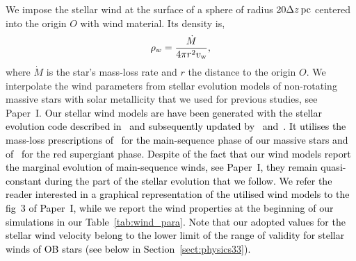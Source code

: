 \documentclass[useAMS,usenatbib]{mn2e}
\begin{document}
We impose the stellar wind at the surface of a sphere of 
radius $20\Delta z\, \rm pc$ centered into the origin $O$ with 
wind material. Its density is, 
%
\begin{equation}
	\rho_{w} = \frac{ \dot{M} }{ 4\pi r^{2} v_{\rm w} },
\label{eq:wind}
\end{equation}
%
where $\dot{M}$ is the star's mass-loss rate and $r$ the distance to the origin 
$O$. We interpolate the wind parameters from stellar evolution models of 
non-rotating massive stars with solar metallicity that we used for previous 
studies, see Paper~I. 
\textcolor{black}{
Our stellar wind models are have been generated with the stellar evolution code 
described in~\citet{heger_apj_626_2005} and subsequently updated 
by~\citet{yoon_443_aa_2005,petrovic_aa_435_2005} and~\citet{brott_aa_530_2011a}.
It utilises the mass-loss prescriptions 
of~\citet{kudritzki_aa_219_1989} for the main-sequence phase of our massive 
stars and of~\citet{dejager_aas_72_1988} for the red supergiant phase. 
Despite of the fact that our 
wind models report the marginal evolution of 
main-sequence winds, see Paper~I, they remain quasi-constant during the part of 
the stellar evolution that we follow. 
We refer the reader 
interested in a graphical representation of the utilised wind models to the fig~3 
of Paper~I, while we report the wind properties at the beginning of our simulations 
in our Table~\ref{tab:wind_para}.  
}
\textcolor{black}{
Note that our adopted values for the stellar wind velocity belong to the lower 
limit of the range of validity for stellar winds of OB stars (see below in 
Section~\ref{sect:physics33}).
}
\end{document}
